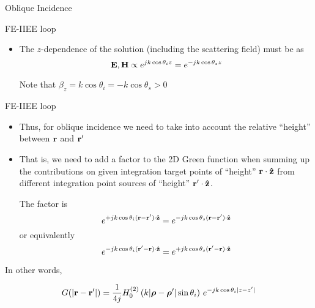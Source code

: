\begin{frame}[allowframebreaks]{Oblique Incidence}
\begin{block}{FE-IIEE loop}
\begin{itemize}
      \item The $z$-dependence of the solution (including the scattering field) must be as
        \begin{equation*}
          \mathbf{E},\mathbf{H} \propto   e^{j k \cos\theta_i z} =   e^{-j k \cos\theta_s z}
        \end{equation*}

        Note that $\beta_z=k\cos\theta_i=-k\cos\theta_s>0$
        
      \end{itemize}
    \end{block}

        
    \begin{block}{FE-IIEE loop \insertcontinuationtext}
      \begin{itemize}
      \item Thus, for oblique incidence we need to take into account
        the relative ``height'' between $\mathbf{r}$ and $\mathbf{r^\prime}$

      \item That is, we need to add a factor to the 2D Green function
        when summing up the contributions on given integration target
        points of ``height'' $\mathbf{r}\cdot\mathbf{\hat{z}}$ from different
        integration point sources of ``height'' $\mathbf{r^\prime}\cdot\mathbf{\hat{z}}$.

        \vbss
        
        The factor is
        \begin{equation*}
          e^{+j k \cos\theta_i (\mathbf{r}-\mathbf{r^\prime})\cdot\mathbf{\hat{z}}}
          =   e^{-j k \cos\theta_s (\mathbf{r}-\mathbf{r^\prime})\cdot\mathbf{\hat{z}}} 
        \end{equation*}
        or equivalently 
        \begin{equation*}
          e^{-j k \cos\theta_i (\mathbf{r^\prime}-\mathbf{r})\cdot\mathbf{\hat{z}}}
          =   e^{+j k \cos\theta_s (\mathbf{r^\prime}-\mathbf{r})\cdot\mathbf{\hat{z}}}
        \end{equation*}
        
      \end{itemize}
    \end{block}

    \newpage 
    
    \begin{block}{In other words,}
      
      \begin{equation*}
        G(|\mathbf{r}-\mathbf{r^\prime}|) = \dfrac{1}{4j}
        H_0^{(2)}\left( k|\boldsymbol{\rho}-\boldsymbol{\rho}^\prime|\sin\theta_i\right) \,
        e^{-j k \cos\theta_i |z-z^\prime|}
      \end{equation*}


\end{block}
\end{frame}
